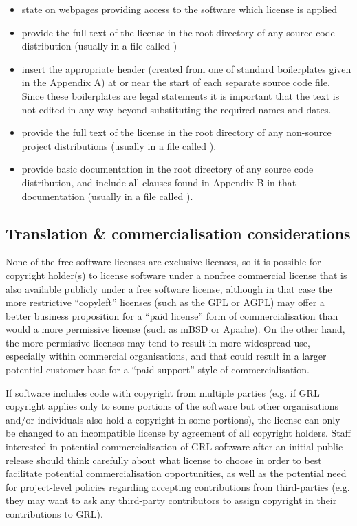 \documentclass[10pt,a4paper]{article}
\begin{document}
\begin{itemize}
\item state on webpages providing access to the software which license is applied 
\item provide the full text of the license in the root directory of any source code 
distribution (usually in a file called ) 
\item insert the appropriate header (created from one of standard boilerplates given in 
the Appendix A) at or near the start of each separate source code file. Since these 
boilerplates are legal statements it is important that the text is not edited in any 
way beyond substituting the required names and dates.
\item provide the full text of the license in the root directory of any non-source project 
distributions (usually in a file called ). 
\item provide basic documentation in the root directory of any source code 
distribution, and include all clauses found in Appendix B in that documentation 
(usually in a file called ). 
\end{itemize}



\subsection{Translation \& commercialisation considerations}

\par None of the free software licenses are exclusive licenses, so it 
is possible for copyright holder(s) to license software under 
a nonfree commercial license that is also available publicly under a free 
software license, although in that case the more restrictive ``copyleft'' 
licenses (such as the GPL or AGPL) may offer a better business
proposition for a ``paid license'' form of commercialisation than would 
a more permissive license (such as mBSD or Apache). On the other hand, 
the more permissive licenses may tend to result in more widespread use, 
especially within commercial organisations, and that could result in a 
larger potential customer base for a ``paid support'' style of commercialisation. 

\par If software includes code with copyright from multiple parties 
(e.g. if GRL copyright applies only to some portions of the software but other 
organisations and/or individuals also hold a copyright in some portions), the 
license can only be changed to an incompatible license by agreement of all 
copyright holders. Staff interested in potential commercialisation of GRL 
software after an initial public release should think carefully about what 
license to choose in order to best facilitate potential commercialisation 
opportunities, as well as the potential need for project-level policies 
regarding accepting contributions from third-parties (e.g. they may want to 
ask any third-party contributors to assign copyright in their contributions to 
GRL). 
\end{document}
